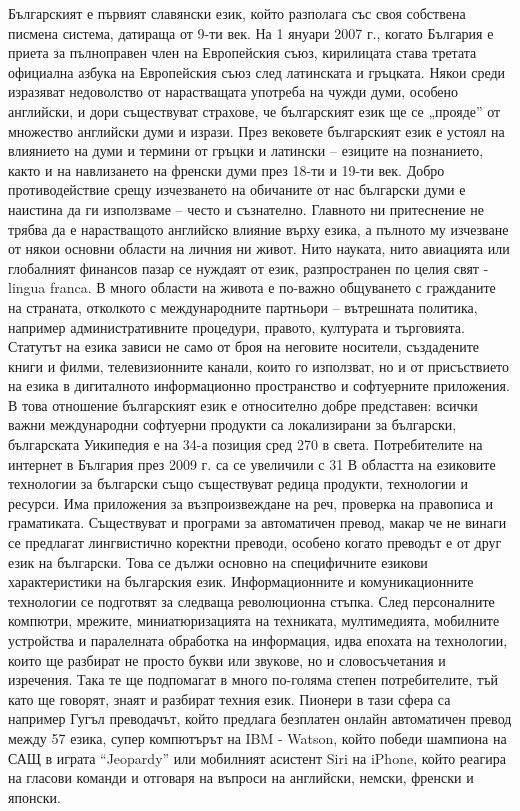 \begin{multicols}{2}
Българският е първият славянски език, който разполага със своя собствена писмена система, датираща от 9-ти век. На 1 януари 2007 г., когато България е приета за пълноправен член на Европейския съюз, кирилицата става третата официална азбука на Европейския съюз след латинската и гръцката. 
Някои среди изразяват недоволство от нарастващата употреба на чужди думи, особено английски, и дори съществуват страхове, че българският език ще се „прояде” от множество английски думи и изрази. През вековете българският език е устоял на влиянието на думи и термини от гръцки и латински – езиците на познанието, както и на навлизането на френски думи през 18-ти и 19-ти век. Добро противодействие срещу изчезването на обичаните от нас български думи е наистина да ги използваме – често и съзнателно.
Главното ни притеснение не трябва да е нарастващото английско влияние върху езика, а пълното му изчезване от някои основни области на личния ни живот. Нито науката, нито авиацията или глобалният финансов пазар се нуждаят от език, разпространен по целия свят -  lingua franca. В много области на живота е по-важно общуването с гражданите на страната, отколкото с международните партньори – вътрешната политика, например административните процедури, правото, културата и търговията. Статутът на езика зависи не само от броя на неговите носители, създадените книги и филми, телевизионните канали, които го използват, но и от присъствието на езика в дигиталното информационно пространство и софтуерните приложения.
В това отношение българският език е относително добре представен: всички важни международни софтуерни продукти са локализирани за български, българската Уикипедия е на 34-а  позиция сред 270 в света. Потребителите на интернет в България през 2009 г. са се увеличили с 31%
В областта на езиковите технологии за български също съществуват редица продукти, технологии и ресурси. Има приложения за възпроизвеждане на реч, проверка на правописа и граматиката. Съществуват и програми за автоматичен превод, макар че не винаги се предлагат лингвистично коректни преводи, особено когато преводът е от друг език на  български. Това се дължи основно на специфичните езикови характеристики на българския език.
Информационните и комуникационните технологии се подготвят за следваща революционна стъпка. След персоналните компютри, мрежите, миниатюризацията на техниката, мултимедията,  мобилните устройства и паралелната обработка на информация, идва епохата на технологии, които ще разбират не просто букви или звукове, но и словосъчетания и изречения. Така те ще подпомагат в много по-голяма степен потребителите, тъй като ще говорят, знаят и разбират техния език. Пионери в тази сфера са например Гугъл преводачът, който предлага безплатен онлайн автоматичен превод между 57 езика, супер компютърът на IBM - Watson, който победи шампиона на САЩ в играта “Jeopardy” или мобилният асистент Siri на iPhone, който реагира на гласови команди и отговаря на въпроси на английски, немски, френски и японски. 

\end{multicols}
